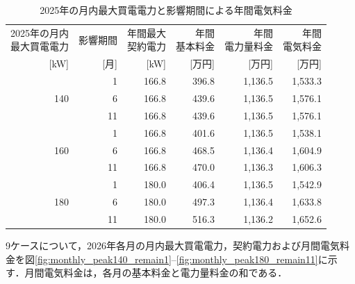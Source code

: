 \documentclass[a4paper,11pt,dvipdfmx]{jsarticle}
\begin{document}
\begin{table}[H]
    \centering
    \small
    \caption{2025年の月内最大買電電力と影響期間による年間電気料金}
    \label{tab:cost_results}
    \begin{tabular}{rrrrrr}
        \toprule
        \shortstack{2025年の月内                                                          \\最大買電電力}
                             & 影響期間
                             & \shortstack{年間最大                                       \\契約電力}
                             & \shortstack{年間                                         \\基本料金}
                             & \shortstack{年間                                         \\電力量料金}
                             & \shortstack{年間                                         \\電気料金} \\
        {[kW]}               & {[月]}            & {[kW]} & {[万円]} & {[万円]}  & {[万円]}  \\
        \midrule
        \multirow{3}{*}{140} & 1                & 166.8  & 396.8  & 1,136.5 & 1,533.3 \\
                             & 6                & 166.8  & 439.6  & 1,136.5 & 1,576.1 \\
                             & 11               & 166.8  & 439.6  & 1,136.5 & 1,576.1 \\
        \midrule
        \multirow{3}{*}{160} & 1                & 166.8  & 401.6  & 1,136.5 & 1,538.1 \\
                             & 6                & 166.8  & 468.5  & 1,136.4 & 1,604.9 \\
                             & 11               & 166.8  & 470.0  & 1,136.3 & 1,606.3 \\
        \midrule
        \multirow{3}{*}{180} & 1                & 180.0  & 406.4  & 1,136.5 & 1,542.9 \\
                             & 6                & 180.0  & 497.3  & 1,136.4 & 1,633.8 \\
                             & 11               & 180.0  & 516.3  & 1,136.2 & 1,652.6 \\
        \bottomrule
    \end{tabular}
\end{table}

9ケースについて，2026年各月の月内最大買電電力，契約電力および月間電気料金を図\ref{fig:monthly_peak140_remain1}--\ref{fig:monthly_peak180_remain11}に示す．月間電気料金は，各月の基本料金と電力量料金の和である．
\end{document}
